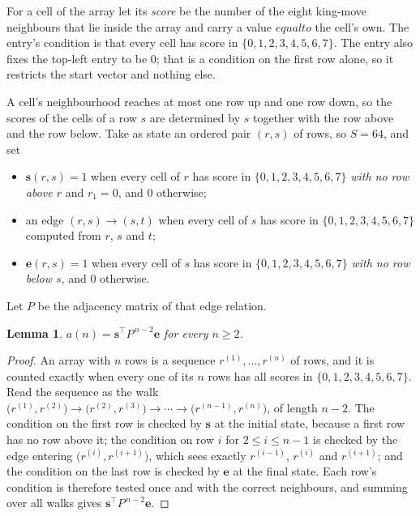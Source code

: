 \documentclass[11pt,a4paper]{article}
\theoremstyle{plain}
\newtheorem{lemma}[theorem]{Lemma}
\theoremstyle{definition}
\begin{document}
For a cell of the array let its \emph{score} be the number of the eight king-move neighbours that lie inside
the array and carry a value $equal to$ the cell's own. The entry's condition is that every cell
has score in $\{0,1,2,3,4,5,6,7\}$. The entry also fixes the top-left entry to be $0$; that is a condition on the first row alone, so it restricts the start vector and nothing else.

A cell's neighbourhood reaches at most one row up and one row down, so the scores of the
cells of a row $s$ are determined by $s$ together with the row above and the row below.
Take as state an ordered pair $(r,s)$ of rows, so $S=64$, and set
\begin{itemize}
\item $\mathbf{s}(r,s)=1$ when every cell of $r$ has score in $\{0,1,2,3,4,5,6,7\}$ \emph{with no row
above $r$} and $r_1=0$, and $0$ otherwise;
\item an edge $(r,s)\to(s,t)$ when every cell of $s$ has score in $\{0,1,2,3,4,5,6,7\}$ computed from
$r$, $s$ and $t$;
\item $\mathbf{e}(r,s)=1$ when every cell of $s$ has score in $\{0,1,2,3,4,5,6,7\}$ \emph{with no row
below $s$}, and $0$ otherwise.
\end{itemize}
Let $P$ be the adjacency matrix of that edge relation.

\begin{lemma}\label{lem:walk}
$a(n)=\mathbf{s}^{\!\top}P^{\,n-2}\mathbf{e}$ for every $n\ge2$.
\end{lemma}

\begin{proof}
An array with $n$ rows is a sequence $r^{(1)},\dots,r^{(n)}$ of rows, and it is counted
exactly when every one of its $n$ rows has all scores in $\{0,1,2,3,4,5,6,7\}$. Read the sequence as the
walk $\bigl(r^{(1)},r^{(2)}\bigr)\to\bigl(r^{(2)},r^{(3)}\bigr)\to\cdots\to
\bigl(r^{(n-1)},r^{(n)}\bigr)$, of length $n-2$. The condition on the first row is
checked by $\mathbf{s}$ at the initial state, because a first row has no row above it; the
condition on row $i$ for $2\le i\le n-1$ is checked by the edge entering
$\bigl(r^{(i)},r^{(i+1)}\bigr)$, which sees exactly $r^{(i-1)}$, $r^{(i)}$ and
$r^{(i+1)}$; and the condition on the last row is checked by $\mathbf{e}$ at the final
state. Each row's condition is therefore tested once and with the correct neighbours, and
summing over all walks gives $\mathbf{s}^{\!\top}P^{\,n-2}\mathbf{e}$.
\end{proof}
\end{document}
